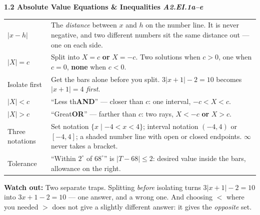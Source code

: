 \documentclass[10pt]{article}
\newcommand{\sghead}[2]{%
  \boxguard[10]%
  \vspace{4pt}\par\noindent
  \colorbox{forest}{\parbox{\dimexpr\linewidth-2\fboxsep}{%
    \small\color{white}\bfseries #1 \hfill \textmd{\itshape\scriptsize\color{forestmid} #2}}}%
  \vspace{2pt}\par}
\newcommand{\sgwatch}[1]{%
  \vspace{1pt}\par\noindent
  \colorbox{redbg}{\parbox{\dimexpr\linewidth-2\fboxsep}{%
    \footnotesize\textbf{\textcolor{redacc}{Watch out:}} #1}}%
  \vspace{1pt}\par}
\newcommand{\sgtabsetup}{\renewcommand{\arraystretch}{1.06}\footnotesize}
\begin{document}
\sghead{1.2 \quad Absolute Value Equations \& Inequalities}{A2.EI.1a--e}
{\sgtabsetup
\begin{tabularx}{\linewidth}{@{} G X @{}}
$|x-h|$ & The \emph{distance} between $x$ and $h$ on the number line. It is never negative, and
  two different numbers sit the same distance out --- one on each side. \\
$|X|=c$ & Split into $X=c$ \textbf{or} $X=-c$. Two solutions when $c>0$, one when $c=0$,
  \textbf{none} when $c<0$. \\
Isolate first & Get the bars alone before you split. $3|x+1|-2=10$ becomes $|x+1|=4$
  \emph{first}. \\
$|X|<c$ & ``Less th\textbf{AND}'' --- closer than $c$: one interval, $-c<X<c$. \\
$|X|>c$ & ``Great\textbf{OR}'' --- farther than $c$: two rays, $X<-c$ \textbf{or} $X>c$. \\
Three notations & Set notation $\{x \mid -4<x<4\}$; interval notation $(-4,4)$ or $[-4,4]$; a
  shaded number line with open or closed endpoints. $\infty$ never takes a bracket. \\
Tolerance & ``Within $2^\circ$ of $68^\circ$'' is $|T-68|\le 2$: desired value inside the bars,
  allowance on the right. \\
\end{tabularx}}
\sgwatch{Two separate traps. Splitting \emph{before} isolating turns $3|x+1|-2=10$ into
$3x+1-2=10$ --- one answer, and a wrong one. And choosing $<$ where you needed $>$ does not give
a slightly different answer: it gives the \emph{opposite} set.}
\end{document}

